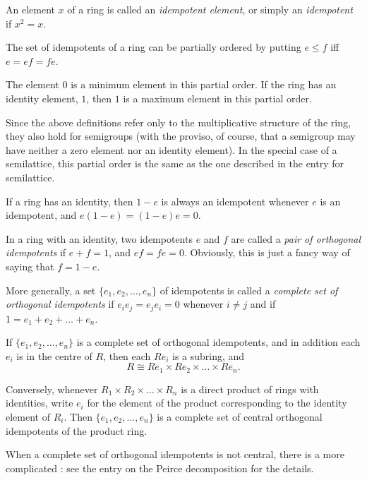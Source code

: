 \documentclass[12pt]{article}
\newcommand{\isom}{\cong}
\begin{document}

An element $x$ of a ring is called an \emph{idempotent element}, or simply an \emph{idempotent} if $x^2 = x$.

The set of idempotents of a ring can be partially ordered by putting $e \le f$ iff $e = ef = fe$.

The element $0$ is a minimum element in this partial order.  If the ring has an identity element, $1$, then $1$ is a maximum element in this partial order.

Since the above definitions refer only to the multiplicative structure of the ring, they also hold for semigroups (with the proviso, of course, that a semigroup may have neither a zero element nor an identity element).  In the special case of a semilattice, this partial order is the same as the one described in the entry for semilattice.

If a ring has an identity, then $1 - e$ is always an idempotent whenever $e$ is an idempotent, and $e(1-e) = (1-e)e = 0$.

In a ring with an identity, two idempotents $e$ and $f$ are called a \emph{pair of orthogonal idempotents} if $e + f = 1$, and $ef = fe = 0$.  Obviously, this is just a fancy way of saying that $f = 1 - e$.

More generally, a set $\{e_1, e_2, \dots, e_n\}$ of idempotents is called a \emph{complete set of orthogonal idempotents} if $e_i e_j = e_j e_i = 0$ whenever $i \neq j$ and if $1 = e_1 + e_2 + \dots + e_n$.

If $\{e_1, e_2, \dots, e_n\}$ is a complete set of orthogonal idempotents,
and in addition each $e_i$ is in the centre of $R$, then each $Re_i$ is a subring, and $$R \isom Re_1 \times Re_2 \times \dots \times Re_n.$$

Conversely, whenever $R_1 \times R_2 \times \dots \times R_n$ is a direct
product of rings with identities, write $e_i$ for the element of the product
corresponding to the identity element of $R_i$.  Then $\{e_1, e_2, \dots, e_n\}$ is a complete set of central orthogonal idempotents of the product ring.

When a complete set of orthogonal idempotents is not central, there is a more complicated : see the entry on the Peirce decomposition for the details.
\end{document}
